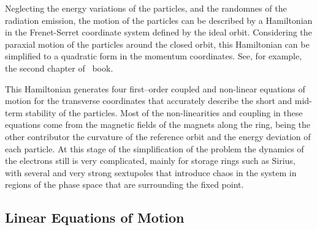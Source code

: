     Neglecting the energy variations of the particles, and the randomnes of the radiation emission, the motion of the particles can be described by a Hamiltonian in the Frenet-Serret coordinate system defined by the ideal orbit. Considering the paraxial motion of the particles around the closed orbit, this Hamiltonian can be simplified to a quadratic form in the momentum coordinates. See, for example, the second chapter of~ book.

    This Hamiltonian generates four first--order coupled and non-linear equations of motion for the transverse coordinates that accurately describe the short and mid-term stability of the particles. Most of the non-linearities and coupling in these equations come from the magnetic fields of the magnets along the ring, being the other contributor the curvature of the reference orbit and the energy deviation of each particle. At this stage of the simplification of the problem the dynamics of the electrons still is very complicated, mainly for storage rings such as Sirius, with several and very strong sextupoles that introduce chaos in the system in regions of the phase space that are surrounding the fixed point.

\subsection{Linear Equations of Motion}

